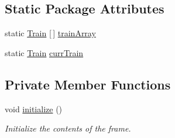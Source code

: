 \subsection*{Static Package Attributes}
\begin{DoxyCompactItemize}
\item 
static \hyperlink{classtrainModel_1_1Train}{Train} \mbox{[}$\,$\mbox{]} \hyperlink{classtrainModel_1_1trainModeUI_a5033486d5a74c3044a2c1bae958098aa}{train\+Array}
\item 
static \hyperlink{classtrainModel_1_1Train}{Train} \hyperlink{classtrainModel_1_1trainModeUI_aa9b65602131a0017c35ba3971d414793}{curr\+Train}
\end{DoxyCompactItemize}
\subsection*{Private Member Functions}
\begin{DoxyCompactItemize}
\item 
void \hyperlink{classtrainModel_1_1trainModeUI_a16cac97f7a09b9f1fbe5bf6a9c6909e8}{initialize} ()
\begin{DoxyCompactList}\small\item\em Initialize the contents of the frame. \end{DoxyCompactList}\end{DoxyCompactItemize}
